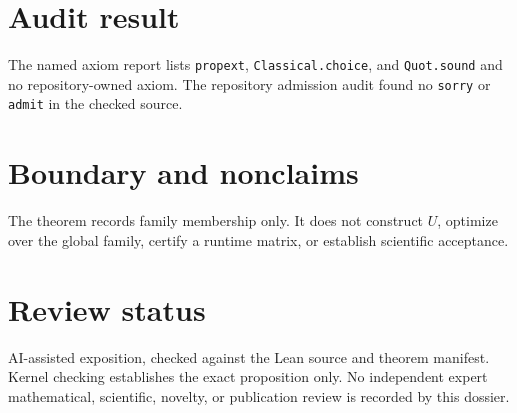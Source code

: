 \documentclass[11pt]{article}
\begin{document}
\section{Audit result}
The named axiom report lists \texttt{propext}, \texttt{Classical.choice}, and
\texttt{Quot.sound} and no repository-owned axiom. The repository admission audit found no
\texttt{sorry} or \texttt{admit} in the checked source.

\section{Boundary and nonclaims}
The theorem records family membership only. It does not construct $U$, optimize over the global
family, certify a runtime matrix, or establish scientific acceptance.

\section{Review status}
AI-assisted exposition, checked against the Lean source and theorem manifest. Kernel checking
establishes the exact proposition only. No independent expert mathematical, scientific,
novelty, or publication review is recorded by this dossier.
\end{document}
